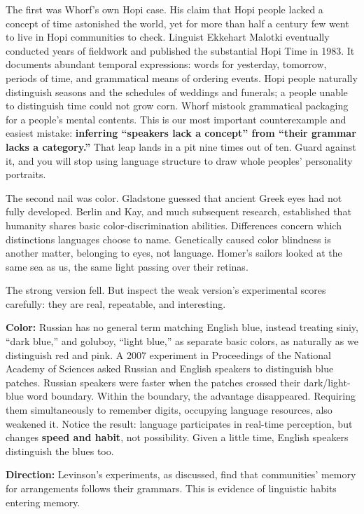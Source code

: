 The first was Whorf's own Hopi case. His claim that Hopi people lacked a concept of time astonished the world, yet for more than half a century few went to live in Hopi communities to check. Linguist Ekkehart Malotki eventually conducted years of fieldwork and published the substantial Hopi Time in 1983. It documents abundant temporal expressions: words for yesterday, tomorrow, periods of time, and grammatical means of ordering events. Hopi people naturally distinguish seasons and the schedules of weddings and funerals; a people unable to distinguish time could not grow corn. Whorf mistook grammatical packaging for a people's mental contents. This is our most important counterexample and easiest mistake: \textbf{inferring ``speakers lack a concept'' from ``their grammar lacks a category.''} That leap lands in a pit nine times out of ten. Guard against it, and you will stop using language structure to draw whole peoples' personality portraits.

The second nail was color. Gladstone guessed that ancient Greek eyes had not fully developed. Berlin and Kay, and much subsequent research, established that humanity shares basic color-discrimination abilities. Differences concern which distinctions languages choose to name. Genetically caused color blindness is another matter, belonging to eyes, not language. Homer's sailors looked at the same sea as us, the same light passing over their retinas.

The strong version fell. But inspect the weak version's experimental scores carefully: they are real, repeatable, and interesting.

\textbf{Color:} Russian has no general term matching English blue, instead treating siniy, ``dark blue,'' and goluboy, ``light blue,'' as separate basic colors, as naturally as we distinguish red and pink. A 2007 experiment in Proceedings of the National Academy of Sciences asked Russian and English speakers to distinguish blue patches. Russian speakers were faster when the patches crossed their dark/light-blue word boundary. Within the boundary, the advantage disappeared. Requiring them simultaneously to remember digits, occupying language resources, also weakened it. Notice the result: language participates in real-time perception, but changes \textbf{speed and habit}, not possibility. Given a little time, English speakers distinguish the blues too.

\textbf{Direction:} Levinson's experiments, as discussed, find that communities' memory for arrangements follows their grammars. This is evidence of linguistic habits entering memory.

